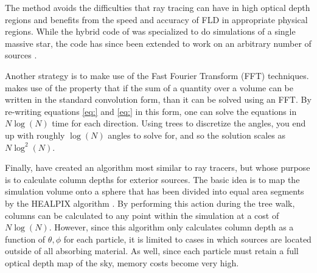 The method avoids the difficulties that ray tracing can have in high optical depth regions and benefits from the speed and accuracy of FLD in appropriate physical regions. While the hybrid code of \citet{kuiperEt10} was specialized to do simulations of a single massive star, the code has since been extended to work on an arbitrary number of sources \citep{klassenEt2014}.

Another strategy is to make use of the Fast Fourier Transform (FFT) techniques. \citet{cen02} makes use of the property that if the sum of a quantity over a volume can be written in the standard convolution form, than it can be solved using an FFT. By re-writing equations \ref{eq:} and \ref{eq:} in this form, one can solve the equations in $N\log(N)$ time for each direction. Using trees to discretize the angles, you end up with roughly $\log(N)$ angles to solve for, and so the solution scales as $N\log^2(N)$.

Finally, \citet{clarkEt12} have created an algorithm most similar to ray tracers, but whose purpose is to calculate column depths for exterior sources. The basic idea is to map the simulation volume onto a sphere that has been divided into equal area segments by the HEALPIX algorithm \citep{gorskiEt05}. By performing this action during the tree walk, columns can be calculated to any point within the simulation at a cost of $N\log(N)$. However, since this algorithm only calculates column depth as a function of $\theta, \phi$ for each particle, it is limited to cases in which sources are located outside of all absorbing material. As well, since each particle must retain a full optical depth map of the sky, memory costs become very high.




